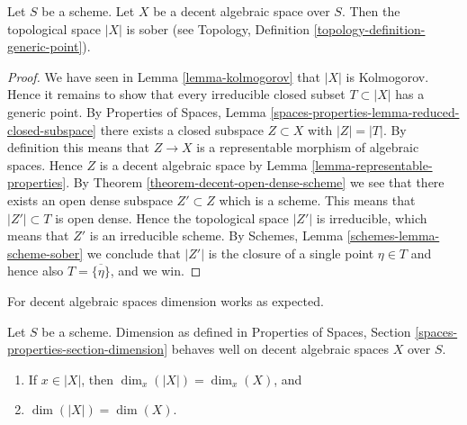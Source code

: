 \begin{proposition}
\label{proposition-reasonable-sober}
Let $S$ be a scheme. Let $X$ be a decent algebraic space over $S$.
Then the topological space $|X|$ is sober (see
Topology, Definition \ref{topology-definition-generic-point}).
\end{proposition}

\begin{proof}
We have seen in Lemma \ref{lemma-kolmogorov} that $|X|$ is Kolmogorov.
Hence it remains to show that every irreducible closed subset
$T \subset |X|$ has a generic point. By
Properties of Spaces,
Lemma \ref{spaces-properties-lemma-reduced-closed-subspace}
there exists a closed subspace $Z \subset X$ with $|Z| = |T|$.
By definition this means that $Z \to X$ is a representable morphism
of algebraic spaces. Hence $Z$ is a decent algebraic space
by Lemma \ref{lemma-representable-properties}. By
Theorem \ref{theorem-decent-open-dense-scheme}
we see that there exists an open dense subspace $Z' \subset Z$
which is a scheme. This means that $|Z'| \subset T$ is open dense.
Hence the topological space $|Z'|$ is irreducible, which means that
$Z'$ is an irreducible scheme. By
Schemes, Lemma \ref{schemes-lemma-scheme-sober}
we conclude that $|Z'|$ is the closure of a single point $\eta \in T$
and hence also $T = \overline{\{\eta\}}$, and we win.
\end{proof}

\noindent
For decent algebraic spaces dimension works as expected.

\begin{lemma}
\label{lemma-dimension-decent-space}
Let $S$ be a scheme. Dimension as defined in
Properties of Spaces, Section \ref{spaces-properties-section-dimension}
behaves well on decent algebraic spaces $X$ over $S$.
\begin{enumerate}
\item If $x \in |X|$, then $\dim_x(|X|) = \dim_x(X)$, and
\item $\dim(|X|) = \dim(X)$.
\end{enumerate}
\end{lemma}

